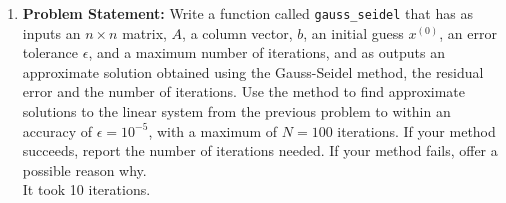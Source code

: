 \documentclass[12pt,twoside]{amsart}
\begin{document}
\begin{enumerate}
    \item\textbf{Problem Statement:} Write a function called \texttt{gauss\_seidel} that has as inputs an $n \times n$ matrix, $A$, a column vector, $b$, an initial guess $x^{(0)}$, an error tolerance $\epsilon$, and a maximum number of iterations, and as outputs an approximate solution obtained using the Gauss-Seidel method, the residual error and the number of iterations. Use the method to find approximate solutions to the linear system from the previous problem to within an accuracy of $\epsilon = 10^{-5}$, with a maximum of $N = 100$ iterations. If your method succeeds, report the number of iterations needed. If your method fails, offer a possible reason why. \\
    
    It took 10 iterations. \\
    \bigskip
\end{enumerate}
\end{document}
